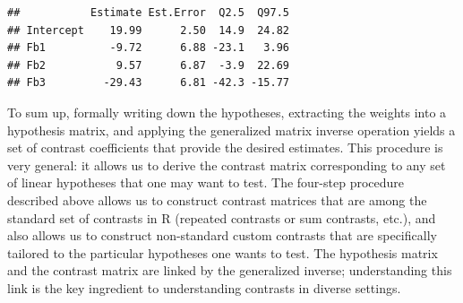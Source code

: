 \documentclass[12pt,]{krantz}
\newenvironment{Shaded}{\begin{snugshade}}{\end{snugshade}}
\newcommand{\DataTypeTok}[1]{\textcolor[rgb]{0.13,0.29,0.53}{#1}}
\newcommand{\DecValTok}[1]{\textcolor[rgb]{0.00,0.00,0.81}{#1}}
\newcommand{\KeywordTok}[1]{\textcolor[rgb]{0.13,0.29,0.53}{\textbf{#1}}}
\newcommand{\NormalTok}[1]{#1}
\newcommand{\OperatorTok}[1]{\textcolor[rgb]{0.81,0.36,0.00}{\textbf{#1}}}
\newcommand{\StringTok}[1]{\textcolor[rgb]{0.31,0.60,0.02}{#1}}
\theoremstyle{definition}
\theoremstyle{definition}
\theoremstyle{definition}
\theoremstyle{remark}
\begin{document}
\begin{Shaded}
\end{Shaded}

\begin{verbatim}
##           Estimate Est.Error  Q2.5  Q97.5
## Intercept    19.99      2.50  14.9  24.82
## Fb1          -9.72      6.88 -23.1   3.96
## Fb2           9.57      6.87  -3.9  22.69
## Fb3         -29.43      6.81 -42.3 -15.77
\end{verbatim}

To sum up, formally writing down the hypotheses, extracting the weights into a hypothesis matrix, and applying the generalized matrix inverse operation yields a set of contrast coefficients that provide the desired estimates. This procedure is very general: it allows us to derive the contrast matrix corresponding to any set of linear hypotheses that one may want to test. The four-step procedure described above allows us to construct contrast matrices that are among the standard set of contrasts in R (repeated contrasts or sum contrasts, etc.), and also allows us to construct non-standard custom contrasts that are specifically tailored to the particular hypotheses one wants to test. The hypothesis matrix and the contrast matrix are linked by the generalized inverse; understanding this link is the key ingredient to understanding contrasts in diverse settings.
\end{document}
